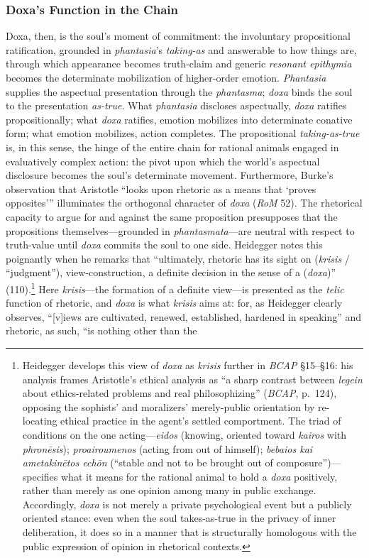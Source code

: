 \subsubsection*{Doxa's Function in the Chain}

Doxa, then, is the soul's moment of commitment: the involuntary propositional ratification, grounded in \textit{phantasia}'s \textit{taking-as} and answerable to how things are, through which appearance becomes truth-claim and generic \textit{resonant epithymia} becomes the determinate mobilization of higher-order emotion. \textit{Phantasia} supplies the aspectual presentation through the \textit{phantasma}; \textit{doxa} binds the soul to the presentation \textit{as-true}. What \textit{phantasia} discloses aspectually, \textit{doxa} ratifies propositionally; what \textit{doxa} ratifies, emotion mobilizes into determinate conative form; what emotion mobilizes, action completes. The propositional \textit{taking-as-true} is, in this sense, the hinge of the entire chain for rational animals engaged in evaluatively complex action: the pivot upon which the world's aspectual disclosure becomes the soul's determinate movement. Furthermore, Burke's observation that Aristotle ``looks upon rhetoric as a means that `proves opposites''' illuminates the orthogonal character of \textit{doxa} (\textit{RoM} 52). The rhetorical capacity to argue for and against the same proposition presupposes that the propositions themselves---grounded in \textit{phantasmata}---are neutral with respect to truth-value until \textit{doxa} commits the soul to one side. Heidegger notes this poignantly when he remarks that ``ultimately, rhetoric has its sight on  (\textit{krisis} / ``judgment''), view-construction, a definite decision in the sense of a  (\textit{doxa})'' (110).\footnote{Heidegger develops this view of \textit{doxa} as \textit{krisis} further in \textit{BCAP} §15--§16: his analysis frames Aristotle's ethical analysis as ``a sharp contrast between \textit{legein} about ethics-related problems and real philosophizing'' (\textit{BCAP}, p.~124), opposing the sophists' and moralizers' merely-public orientation by re-locating ethical practice in the agent's settled comportment. The triad of conditions on the one acting---\textit{eidos} (knowing, oriented toward \textit{kairos} with \textit{phronēsis}); \textit{proairoumenos} (acting from out of himself); \textit{bebaios kai ametakinētos echōn} (``stable and not to be brought out of composure'')---specifies what it means for the rational animal to hold a \textit{doxa} positively, rather than merely as one opinion among many in public exchange. Accordingly, \textit{doxa} is not merely a private psychological event but a publicly oriented stance: even when the soul takes-as-true in the privacy of inner deliberation, it does so in a manner that is structurally homologous with the public expression of opinion in rhetorical contexts.} Here \textit{krisis}---the formation of a definite view---is presented as the \textit{telic} function of rhetoric, and \textit{doxa} is what \textit{krisis} aims at: for, as Heidegger clearly observes, ``[v]iews are cultivated, renewed, established, hardened in speaking'' and rhetoric, as such, ``is nothing other than the 
